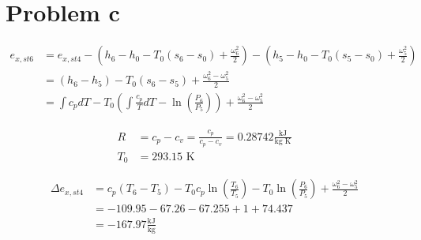 \section*{Problem c}

\begin{align*}
e_{x,st6} &= e_{x,st4} - \left( h_6 - h_0 - T_0 (s_6 - s_0) + \frac{\omega_6^2}{2} \right) - \left( h_5 - h_0 - T_0 (s_5 - s_0) + \frac{\omega_5^2}{2} \right) \\
&= \left( h_6 - h_5 \right) - T_0 (s_6 - s_5) + \frac{\omega_6^2 - \omega_5^2}{2} \\
&= \int c_p dT - T_0 \left( \int \frac{c_p}{T} dT - \ln \left( \frac{P_6}{P_5} \right) \right) + \frac{\omega_6^2 - \omega_5^2}{2}
\end{align*}

\begin{align*}
R &= c_p - c_v = \frac{c_p}{c_p - c_v} = 0.28742 \frac{\text{kJ}}{\text{kg K}} \\
T_0 &= 293.15 \text{ K}
\end{align*}

\begin{align*}
\Delta e_{x,st4} &= c_p \left( T_6 - T_5 \right) - T_0 c_p \ln \left( \frac{T_6}{T_5} \right) - T_0 \ln \left( \frac{P_6}{P_5} \right) + \frac{\omega_6^2 - \omega_5^2}{2} \\
&= -109.95 - 67.26 - 67.255 + 1 + 74.437 \\
&= -167.97 \frac{\text{kJ}}{\text{kg}}
\end{align*}
